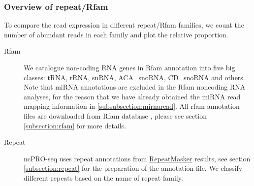 \documentclass[12pt]{article}
\def \ncpip{ncPRO-seq}
\begin{document}
\subsubsection{Overview of repeat/Rfam}
\label{subsubsection:overview}
To compare the read expression in different repeat/Rfam families, we count the number of abundant reads in each family and plot the relative proportion.
\begin{description}
 \item[Rfam] We catalogue non-coding RNA genes in Rfam annotation into five big classes: tRNA, rRNA, snRNA, ACA\_snoRNA, CD\_snoRNA and others. Note that miRNA annotations are excluded in the Rfam noncoding RNA analyses, for the reason that we have already obtained the miRNA read mapping information in \ref{subsubsection:mirnaread}. All rfam annotation files are downloaded from Rfam database \cite{Gardner2011}, please see section \ref{subsection:rfam} for more details.
 \item[Repeat] \ncpip{} uses repeat annotations from \href{http://www.repeatmasker.org/}{ RepeatMasker} \cite{Smit2008} results, see section \ref{subsection:repeat} for the preparation of the annotation file. We classify different repeats based on the name of repeat family.
 \end{description}
\end{document}
